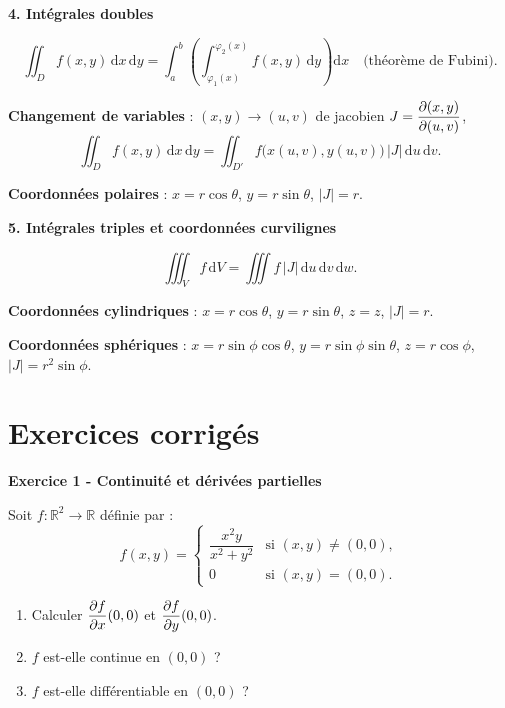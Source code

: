 \documentclass[12pt,a4paper]{article}
\begin{document}
\begin{boiteresume}
\medskip
\textbf{4. Intégrales doubles}

\[
\iint_D f(x,y)\,\mathrm{d}x\,\mathrm{d}y = \int_{a}^{b}\!\left(\int_{\varphi_1(x)}^{\varphi_2(x)} f(x,y)\,\mathrm{d}y\right)\!\mathrm{d}x \quad \text{(théorème de Fubini).}
\]

\textbf{Changement de variables} : $(x,y) \to (u,v)$ de jacobien $J = \dfrac{\partial (x,y)}{\partial (u,v)}$,
\[
\iint_D f(x,y)\,\mathrm{d}x\,\mathrm{d}y = \iint_{D'} f\bigl(x(u,v), y(u,v)\bigr)\,|J|\,\mathrm{d}u\,\mathrm{d}v.
\]

\textbf{Coordonnées polaires} : $x = r\cos\theta$, $y = r\sin\theta$, $|J| = r$.

\medskip
\textbf{5. Intégrales triples et coordonnées curvilignes}

\[
\iiint_V f\,\mathrm{d}V = \iiint f\,|J|\,\mathrm{d}u\,\mathrm{d}v\,\mathrm{d}w.
\]

\textbf{Coordonnées cylindriques} : $x = r\cos\theta$, $y = r\sin\theta$, $z = z$, $|J| = r$.

\textbf{Coordonnées sphériques} : $x = r\sin\phi\cos\theta$, $y = r\sin\phi\sin\theta$, $z = r\cos\phi$, $|J| = r^2\sin\phi$.
\end{boiteresume}

\section{Exercices corrigés}

\begin{boiteexercice}
\textbf{Exercice 1 - Continuité et dérivées partielles}\niveau{\facile}

Soit $f : \mathbb{R}^2 \to \mathbb{R}$ définie par :
\[
f(x,y) = \begin{cases} \dfrac{x^2 y}{x^2 + y^2} & \text{si } (x,y) \neq (0,0), \\ 0 & \text{si } (x,y) = (0,0). \end{cases}
\]

\begin{enumerate}
  \item Calculer $\dfrac{\partial f}{\partial x}(0,0)$ et $\dfrac{\partial f}{\partial y}(0,0)$.
  \item $f$ est-elle continue en $(0,0)$ ?
  \item $f$ est-elle différentiable en $(0,0)$ ?
\end{enumerate}
\end{boiteexercice}
\end{document}
